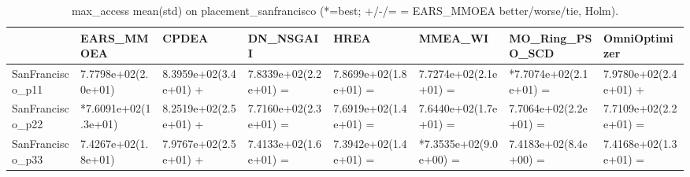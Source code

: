 \begin{table}[t]
\centering
\caption{max_access mean(std) on placement_sanfrancisco (*=best; +/-/= = EARS_MMOEA better/worse/tie, Holm).}
\label{tab:placement_sanfrancisco_max_access}
\begin{tabular}{llllllll}
\toprule
 & EARS\_MMOEA & CPDEA & DN\_NSGAII & HREA & MMEA\_WI & MO\_Ring\_PSO\_SCD & OmniOptimizer \\
\midrule
SanFrancisco\_p11 & 7.7798e+02(2.0e+01) & 8.3959e+02(3.4e+01) + & 7.8339e+02(2.2e+01) = & 7.8699e+02(1.8e+01) = & 7.7274e+02(2.1e+01) = & *7.7074e+02(2.1e+01) = & 7.9780e+02(2.4e+01) + \\
SanFrancisco\_p22 & *7.6091e+02(1.3e+01) & 8.2519e+02(2.5e+01) + & 7.7160e+02(2.3e+01) = & 7.6919e+02(1.4e+01) = & 7.6440e+02(1.7e+01) = & 7.7064e+02(2.2e+01) = & 7.7109e+02(2.2e+01) = \\
SanFrancisco\_p33 & 7.4267e+02(1.8e+01) & 7.9767e+02(2.5e+01) + & 7.4133e+02(1.6e+01) = & 7.3942e+02(1.4e+01) = & *7.3535e+02(9.0e+00) = & 7.4183e+02(8.4e+00) = & 7.4168e+02(1.3e+01) = \\
\bottomrule
\end{tabular}
\end{table}
